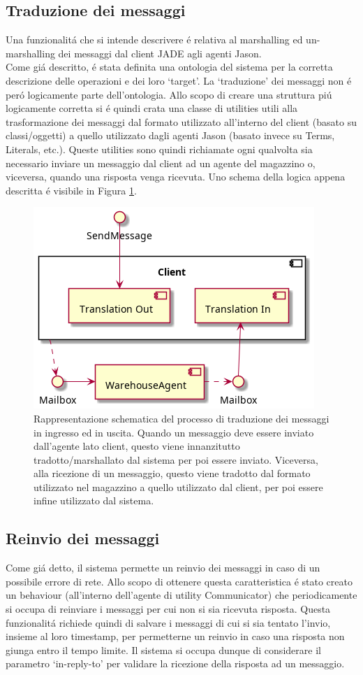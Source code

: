 \subsection{Traduzione dei messaggi}
Una funzionalit\'a che si intende descrivere \'e relativa al marshalling ed un-marshalling dei messaggi dal client JADE agli agenti Jason.\\
Come gi\'a descritto, \'e stata definita una ontologia del sistema per la corretta descrizione delle operazioni e dei loro `target'. La `traduzione' dei messaggi non \'e per\'o logicamente parte dell'ontologia. Allo scopo di creare una struttura pi\'u logicamente corretta si \'e quindi crata una classe di utilities utili alla trasformazione dei messaggi dal formato utilizzato all'interno del client (basato su classi/oggetti) a quello utilizzato dagli agenti Jason (basato invece su Terms, Literals, etc.). Queste utilities sono quindi richiamate ogni qualvolta sia necessario inviare un messaggio dal client ad un agente del magazzino o, viceversa, quando una risposta venga ricevuta. Uno schema della logica appena descritta \'e visibile in Figura \ref{fig:message-translation}.
\begin{figure}[!ht]\centering
    \includegraphics[width=.7\textwidth]{section/implementation/figure/message-translation.png}
    \caption{Rappresentazione schematica del processo di traduzione dei messaggi in ingresso ed in uscita. Quando un messaggio deve essere inviato dall'agente lato client, questo viene innanzitutto tradotto/marshallato dal sistema per poi essere inviato. Viceversa, alla ricezione di un messaggio, questo viene tradotto dal formato utilizzato nel magazzino a quello utilizzato dal client, per poi essere infine utilizzato dal sistema.}
    \label{fig:message-translation}
\end{figure}

\subsection{Reinvio dei messaggi}
Come gi\'a detto, il sistema permette un reinvio dei messaggi in caso di un possibile errore di rete. Allo scopo di ottenere questa caratteristica \'e stato creato un behaviour (all'interno dell'agente di utility Communicator) che periodicamente si occupa di reinviare i messaggi per cui non si sia ricevuta risposta. Questa funzionalit\'a richiede quindi di salvare i messaggi di cui si sia tentato l'invio, insieme al loro timestamp, per permetterne un reinvio in caso una risposta non giunga entro il tempo limite. Il sistema si occupa dunque di considerare il parametro `in-reply-to' per validare la ricezione della risposta ad un messaggio.
